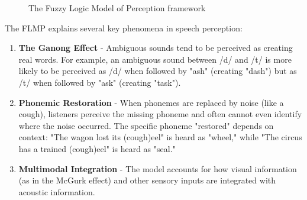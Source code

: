 \documentclass[12pt,a4paper]{article}
\begin{document}
\begin{figure}[h]
\centering
{}
\caption{The Fuzzy Logic Model of Perception framework}
\label{fig:flmp_framework}
\end{figure}

The FLMP explains several key phenomena in speech perception:

\begin{enumerate}
\item \textbf{The Ganong Effect} - Ambiguous sounds tend to be perceived as creating real words. For example, an ambiguous sound between /d/ and /t/ is more likely to be perceived as /d/ when followed by "ash" (creating "dash") but as /t/ when followed by "ask" (creating "task").

\item \textbf{Phonemic Restoration} - When phonemes are replaced by noise (like a cough), listeners perceive the missing phoneme and often cannot even identify where the noise occurred. The specific phoneme "restored" depends on context: "The wagon lost its (cough)eel" is heard as "wheel," while "The circus has a trained (cough)eel" is heard as "seal."

\item \textbf{Multimodal Integration} - The model accounts for how visual information (as in the McGurk effect) and other sensory inputs are integrated with acoustic information.
\end{enumerate}
\end{document}
